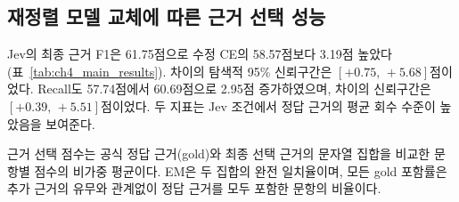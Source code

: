 
\subsection{재정렬 모델 교체에 따른 근거 선택 성능}
\label{sec:ch4_evidence_results}

Jev의 최종 근거 F1은 61.75점으로 수정 CE의 58.57점보다 3.19점
높았다(표~\ref{tab:ch4_main_results}). 차이의 탐색적 95\% 신뢰구간은
$[+0.75,\,+5.68]$점이었다. Recall도 57.74점에서 60.69점으로
2.95점 증가하였으며, 차이의 신뢰구간은 $[+0.39,\,+5.51]$점이었다.
두 지표는 Jev 조건에서 정답 근거의 평균 회수 수준이 높았음을 보여준다.

근거 선택 점수는 공식 정답 근거(gold)와 최종 선택 근거의 문자열
집합을 비교한 문항별 점수의 비가중 평균이다. EM은 두 집합의 완전
일치율이며, 모든 gold 포함률은 추가 근거의 유무와 관계없이 정답
근거를 모두 포함한 문항의 비율이다.

